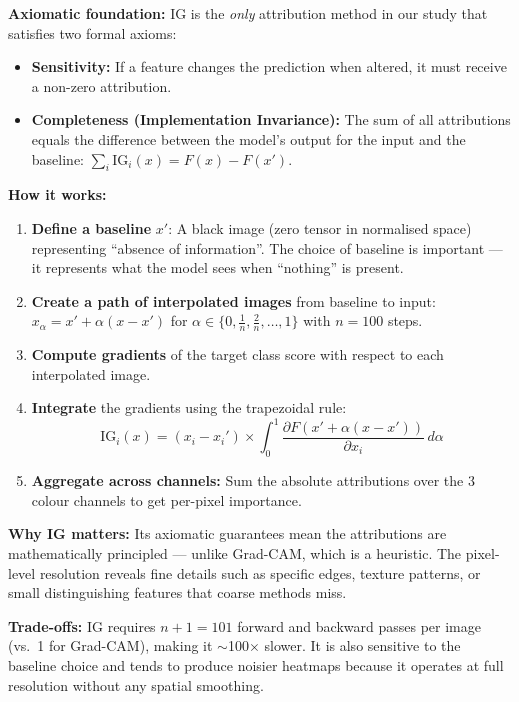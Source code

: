 \documentclass[12pt, a4paper]{article}
\begin{document}
\textbf{Axiomatic foundation:} IG is the \emph{only} attribution method in our
study that satisfies two formal axioms:
\begin{itemize}[leftmargin=*]
    \item \textbf{Sensitivity:} If a feature changes the prediction when
          altered, it must receive a non-zero attribution.
    \item \textbf{Completeness (Implementation Invariance):} The sum of all
          attributions equals the difference between the model's output for the
          input and the baseline: $\sum_i \text{IG}_i(x) = F(x) - F(x')$.
\end{itemize}

\textbf{How it works:}
\begin{enumerate}[leftmargin=*]
    \item \textbf{Define a baseline} $x'$: A black image (zero tensor in
          normalised space) representing ``absence of information''.  The
          choice of baseline is important --- it represents what the model
          sees when ``nothing'' is present.
    \item \textbf{Create a path of interpolated images} from baseline to
          input: $x_\alpha = x' + \alpha(x - x')$ for
          $\alpha \in \{0, \frac{1}{n}, \frac{2}{n}, \ldots, 1\}$ with
          $n = 100$ steps.
    \item \textbf{Compute gradients} of the target class score with respect to
          each interpolated image.
    \item \textbf{Integrate} the gradients using the trapezoidal rule:
          \begin{equation}
          \text{IG}_i(x) = (x_i - x_i') \times \int_0^1
          \frac{\partial F(x' + \alpha(x - x'))}{\partial x_i} \, d\alpha
          \end{equation}
    \item \textbf{Aggregate across channels:} Sum the absolute attributions
          over the 3 colour channels to get per-pixel importance.
\end{enumerate}

\textbf{Why IG matters:} Its axiomatic guarantees mean the attributions are
mathematically principled --- unlike Grad-CAM, which is a heuristic.  The
pixel-level resolution reveals fine details such as specific edges, texture
patterns, or small distinguishing features that coarse methods miss.

\textbf{Trade-offs:} IG requires $n + 1 = 101$ forward and backward passes per
image (vs.\ 1 for Grad-CAM), making it $\sim$100$\times$ slower.  It is also
sensitive to the baseline choice and tends to produce noisier heatmaps because
it operates at full resolution without any spatial smoothing.
\end{document}
